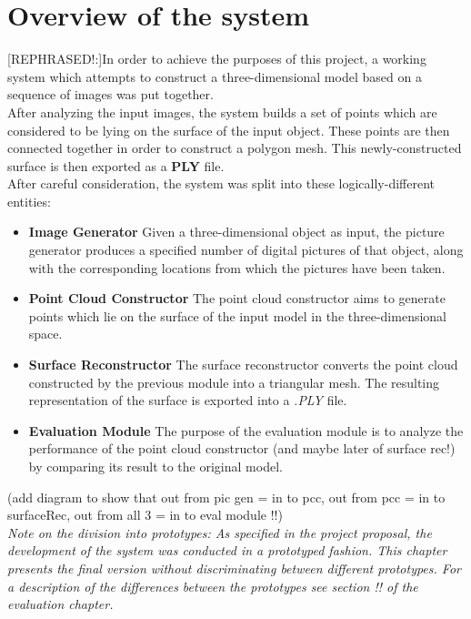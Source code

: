 \documentclass[12pt,a4paper,twoside,openright]{report}
\begin{document}
\section{Overview of the system}
[REPHRASED!:]In order to achieve the purposes of this project, a working system which attempts to construct a three-dimensional model based on a sequence of images was put together. \\
\linebreak
After analyzing the input images, the system builds a set of points which are considered to be lying on the surface of the input object. These points are then connected together in order to construct a polygon mesh. This newly-constructed surface is then exported as a \textbf{PLY} file.\\
\linebreak
After careful consideration, the system was split into these logically-different entities:
\begin{itemize}
\item \textbf{Image Generator}
Given a three-dimensional object as input, the picture generator produces a specified number of digital pictures of that object, along with the corresponding locations from which the pictures have been taken. 
\item \textbf{Point Cloud Constructor}
The point cloud constructor aims to generate points which lie on the surface of the input model in the three-dimensional space. 
\item \textbf{Surface Reconstructor}
The surface reconstructor converts the point cloud constructed by the previous module into a triangular mesh. The resulting representation of the surface is exported into a \textit{.PLY} file.
\item \textbf{Evaluation Module}
The purpose of the evaluation module is to analyze the performance of the point cloud constructor (and maybe later of surface rec!) by comparing its result to the original model. \\
\end{itemize}

(add diagram to show that out from pic gen = in to pcc, out from pcc = in to surfaceRec, out from all 3 = in to eval module !!) \\

\textit{Note on the division into prototypes: As specified in the project proposal, the development of the system was conducted in a prototyped fashion. This chapter presents the final version without discriminating between different prototypes. For a description of the differences between the prototypes see section !! of the evaluation chapter.}
\end{document}
